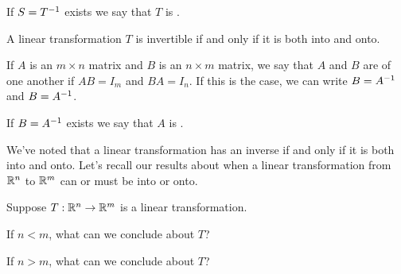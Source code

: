 If $S = T^{-1}$ exists we say that $T$ is {}.  

{} A linear transformation $T$ is invertible if and only if it is both into and
onto.  

{}   
If $A$ is an $m\times n$ matrix and $B$ is an $n\times m$ matrix, we say that 
$A$ and $B$ are {} of one another if $AB = I_m$ and $BA = I_n$. If this is the case, we can write $B = A^{-1}$ and $B = A^{-1}$.  

If $B = A^{-1}$ exists we say that $A$ is {}.  



\endedxtext




\endedxvertical










We've noted that a linear transformation has an inverse if and only if it is both into and onto.  
Let's recall our results about when a linear transformation from $\mathbb R^n$ to $\mathbb R^m$ can or must
be into or onto.  

Suppose $T: \mathbb R^n \rightarrow \mathbb R^m$ is a linear transformation.


If $n<m$, what can we conclude about $T$?  




If $n>m$, what can we conclude about $T$?  







